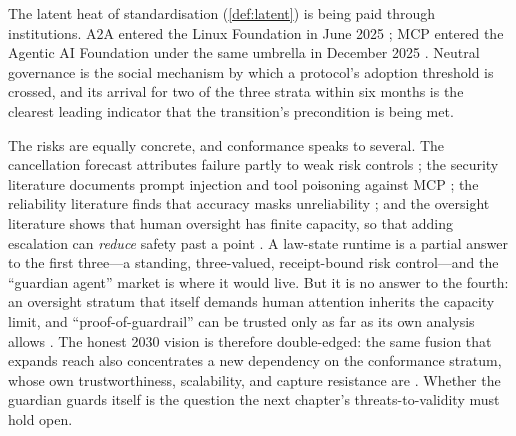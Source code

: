 The latent heat of standardisation (\cref{def:latent}) is being paid through
institutions. A2A entered the Linux Foundation in June 2025
\citep{a2a-lf-donation,lf-a2a-press}; MCP entered the Agentic AI Foundation under
the same umbrella in December 2025 \citep{mcp-aaif-2025,lf-aaif-press}. Neutral
governance is the social mechanism by which a protocol's adoption threshold is
crossed, and its arrival for two of the three strata within six months is the
clearest leading indicator that the transition's precondition is being met.

The risks are equally concrete, and conformance speaks to several. The cancellation
forecast attributes failure partly to weak risk controls
\citep{gartner-agentic-2025}; the security literature documents prompt injection
and tool poisoning against MCP \citep{gaire25,huang26threat,maloyan26}; the
reliability literature finds that accuracy masks unreliability \citep{rabanser26};
and the oversight literature shows that human oversight has finite capacity, so
that adding escalation can \emph{reduce} safety past a point \citep{turan26}. A
law-state runtime is a partial answer to the first three---a standing, three-valued,
receipt-bound risk control---and the ``guardian agent'' market
\citep{gartner-guardian-2025} is where it would live. But it is no answer to the
fourth: an oversight stratum that itself demands human attention inherits the
capacity limit, and ``proof-of-guardrail'' can be trusted only as far as its own
analysis allows \citep{jin26guardrail}. The honest 2030 vision is therefore
double-edged: the same fusion that expands reach also concentrates a new dependency
on the conformance stratum, whose own trustworthiness, scalability, and capture
resistance are \openstat. Whether the guardian guards itself is the question the
next chapter's threats-to-validity must hold open.
